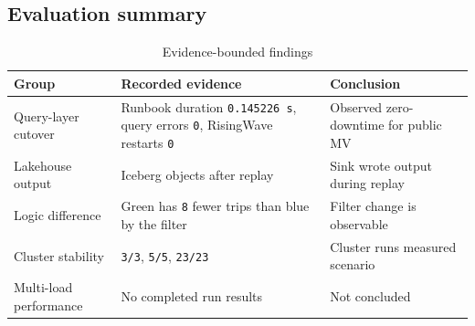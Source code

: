 \subsection{Evaluation summary}
\begin{table}[H]
\centering
\caption{Evidence-bounded findings}
\begin{tabularx}{\textwidth}{@{}p{}p{}Y@{}}
\toprule
\textbf{Group} & \textbf{Recorded evidence} & \textbf{Conclusion}\\
\midrule
Query-layer cutover & Runbook duration \texttt{0.145226 s}, query errors \texttt{0}, RisingWave restarts \texttt{0} & Observed zero-downtime for public MV\\
Lakehouse output & Iceberg objects after replay & Sink wrote output during replay\\
Logic difference & Green has \texttt{8} fewer trips than blue by the filter & Filter change is observable\\
Cluster stability & \texttt{3/3}, \texttt{5/5}, \texttt{23/23} & Cluster runs measured scenario\\
Multi-load performance & No completed run results & Not concluded\\
\bottomrule
\end{tabularx}
\end{table}
